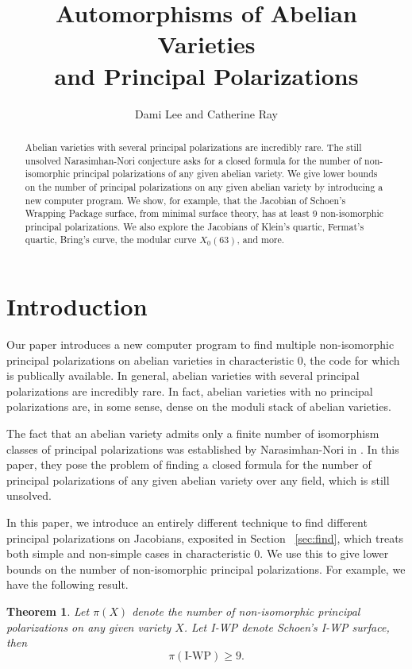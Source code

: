 \documentclass[12pt,reqno]{amsart}
\title{Automorphisms of Abelian Varieties \\ and Principal Polarizations}
\author{Dami Lee and Catherine Ray}
\newtheorem{theorem}{Theorem}
\theoremstyle{definition}
\theoremstyle{remark}
\begin{document}
	
\maketitle

\begin{abstract} Abelian varieties with several principal polarizations are incredibly rare. The still unsolved Narasimhan-Nori conjecture asks for a closed formula for the number of non-isomorphic principal polarizations of any given abelian variety. We give lower bounds on the number of principal polarizations on any given abelian variety by introducing a new computer program.
We show, for example, that the Jacobian of Schoen's Wrapping Package surface, from minimal surface theory, has at least 9 non-isomorphic principal polarizations. We also explore the Jacobians of Klein's quartic, Fermat's quartic, Bring's curve, the modular curve $X_0(63)$, and more.   
\end{abstract}

\section{Introduction}

Our paper introduces a new computer program to find multiple non-isomorphic principal polarizations on abelian varieties in characteristic 0, the code for which is publically available. In general, abelian varieties with several principal polarizations are incredibly rare. In fact, abelian varieties with no principal polarizations are, in some sense, dense on the moduli stack of abelian varieties. %

The fact that an abelian variety admits only a finite number of isomorphism classes of principal polarizations was established by Narasimhan-Nori in \cite{nn}. In this paper, they pose the problem of finding a closed formula for the number of principal polarizations of any given abelian variety over any field, which is still unsolved. 

In this paper, we introduce an entirely different technique to find different principal polarizations on Jacobians, exposited in Section ~\ref{sec:find}, which treats both simple and non-simple cases in characteristic 0. We use this to give lower bounds on the number of non-isomorphic principal polarizations. For example, we have the following result. 

\begin{theorem} \label{IWP} Let $\pi(X)$ denote the number of non-isomorphic principal polarizations on any given variety $X$. Let I-WP denote Schoen's I-WP surface, then $$\pi(\text{I-WP}) \geq 9.$$\end{theorem}
\end{document}
